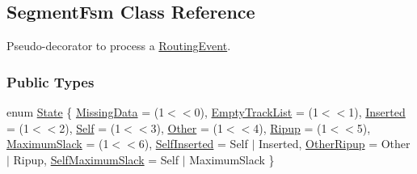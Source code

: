 \hypertarget{classKite_1_1SegmentFsm}{}\subsection{Segment\+Fsm Class Reference}
\label{classKite_1_1SegmentFsm}


Pseudo-\/decorator to process a \hyperlink{classKite_1_1RoutingEvent}{Routing\+Event}.  


\subsubsection*{Public Types}
\begin{DoxyCompactItemize}
\item 
enum \hyperlink{classKite_1_1SegmentFsm_a5d74787dedbc4e11c1ab15bf487e61f8}{State} \{ \newline
\hyperlink{classKite_1_1SegmentFsm_a5d74787dedbc4e11c1ab15bf487e61f8a79ae4f26b8ed9c55b81f981bb5076e1d}{Missing\+Data} = (1$<$$<$0), 
\newline
\hyperlink{classKite_1_1SegmentFsm_a5d74787dedbc4e11c1ab15bf487e61f8a13ac7e0722ca806ff25d8fa9220e980b}{Empty\+Track\+List} = (1$<$$<$1), 
\newline
\hyperlink{classKite_1_1SegmentFsm_a5d74787dedbc4e11c1ab15bf487e61f8abb9adb1672565a2d0c2de07ea840414e}{Inserted} = (1$<$$<$2), 
\newline
\hyperlink{classKite_1_1SegmentFsm_a5d74787dedbc4e11c1ab15bf487e61f8aacd3ef9d889b306ca7e7bdcd37ba659a}{Self} = (1$<$$<$3), 
\newline
\hyperlink{classKite_1_1SegmentFsm_a5d74787dedbc4e11c1ab15bf487e61f8a75f0c3176be2226dfe8ad164a0a034a2}{Other} = (1$<$$<$4), 
\newline
\hyperlink{classKite_1_1SegmentFsm_a5d74787dedbc4e11c1ab15bf487e61f8a08900dc237aef7e4a7f50d2ba1ffd748}{Ripup} = (1$<$$<$5), 
\newline
\hyperlink{classKite_1_1SegmentFsm_a5d74787dedbc4e11c1ab15bf487e61f8a9fc7197613f3435d906edf69a73acf38}{Maximum\+Slack} = (1$<$$<$6), 
\newline
\hyperlink{classKite_1_1SegmentFsm_a5d74787dedbc4e11c1ab15bf487e61f8a8c564779c81599aaadbe879fa2b08d92}{Self\+Inserted} = Self $\vert$ Inserted, 
\newline
\hyperlink{classKite_1_1SegmentFsm_a5d74787dedbc4e11c1ab15bf487e61f8a22374bab829fac7d12af4784d80eeb6e}{Other\+Ripup} = Other $\vert$ Ripup, 
\newline
\hyperlink{classKite_1_1SegmentFsm_a5d74787dedbc4e11c1ab15bf487e61f8a560766bb79539564fdeda432c8efae6d}{Self\+Maximum\+Slack} = Self $\vert$ Maximum\+Slack
 \}
\end{DoxyCompactItemize}
